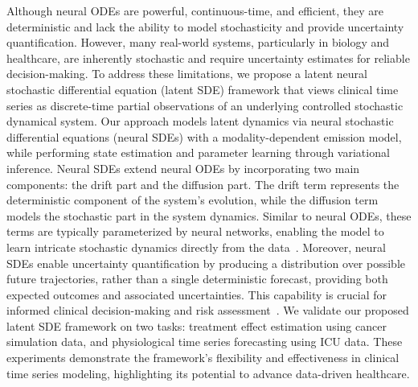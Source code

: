 \documentclass[preprint,12pt]{elsarticle}
\begin{document}
Although neural ODEs are powerful, continuous-time, and efficient, they are deterministic and lack the ability to model stochasticity and provide uncertainty quantification. However, many real-world systems, particularly in biology and healthcare, are inherently stochastic and require  uncertainty estimates for reliable decision-making. To address these limitations, we propose a latent neural stochastic differential equation (latent SDE) framework that views clinical time series as discrete-time partial observations of an underlying controlled stochastic dynamical system. Our approach models latent dynamics via neural stochastic differential equations (neural SDEs) with a modality-dependent emission model, while performing state estimation and parameter learning through variational inference. Neural SDEs extend neural ODEs by incorporating two main components: the drift part and the diffusion part. The drift term represents the deterministic component of the system's evolution, while the diffusion term models the stochastic part in the system dynamics. Similar to neural ODEs, these terms are typically parameterized by neural networks, enabling the model to learn intricate stochastic dynamics directly from the data~\citep{kidger2022neural,tzen2019neural,li2020scalable}. Moreover, neural SDEs enable uncertainty quantification by producing a distribution over possible future trajectories, rather than a single deterministic forecast, providing both expected outcomes and associated uncertainties. This capability is crucial for informed clinical decision-making and risk assessment~\citep{kong2020sde}. We validate our proposed latent SDE framework on two tasks: treatment effect estimation using cancer simulation data, and physiological time series forecasting using ICU data. These experiments demonstrate the framework’s flexibility and effectiveness in clinical time series modeling, highlighting its potential to advance data-driven healthcare.
\end{document}
